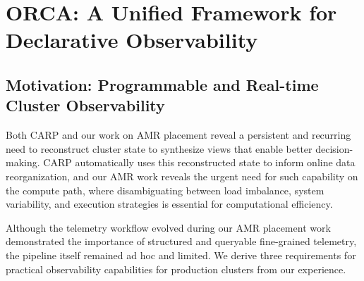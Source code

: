 \chapter{ORCA: A Unified Framework for Declarative Observability}
\label{chap:orca}
\minitoc

\section{Motivation: Programmable and Real-time Cluster Observability}


Both CARP and our work on AMR placement reveal a persistent and recurring need to reconstruct
cluster state to synthesize views that enable better decision-making.
CARP automatically uses this reconstructed state to inform online data reorganization, and our AMR
work reveals the urgent need for such capability on the compute path, where disambiguating between
load imbalance, system variability, and execution strategies is essential for computational
efficiency.

Although the telemetry workflow evolved during our AMR placement work demonstrated the importance
of structured and queryable fine-grained telemetry, the pipeline itself remained ad hoc and limited.
We derive three requirements for practical observability capabilities for production clusters from
our experience.

